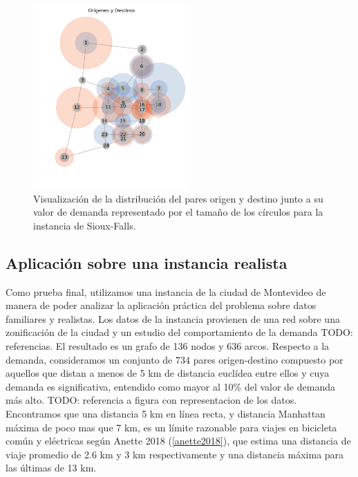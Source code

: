 \documentclass{article}
\begin{document}
  \begin{figure}[h!]
    \centering
    \includegraphics[width=6cm]{../resources/sioux_falls_demand.png}
      \caption{Visualización de la distribución del pares origen y destino junto a su valor de demanda representado por el tamaño de los círculos para la instancia de Sioux-Falls.}
    \label{fig:sioux_falls_demand}
  \end{figure}


  \FloatBarrier
  \subsection{Aplicación sobre una instancia realista}

  Como prueba final, utilizamos una instancia de la ciudad de Montevideo de manera de poder analizar la aplicación práctica del problema sobre datos familiares y realistas. Los datos de la instancia provienen de una red sobre una zonificación de la ciudad y un estudio del comportamiento de la demanda TODO: referencias. El resultado es un grafo de 136 nodos y 636 arcos. Respecto a la demanda, consideramos un conjunto de 734 pares origen-destino compuesto por aquellos que distan a menos de 5 km de distancia euclídea entre ellos y cuya demanda es significativa, entendido como mayor al 10\% del valor de demanda más alto. TODO: referencia a figura con representacion de los datos. Encontramos que una distancia 5 km en línea recta, y distancia Manhattan máxima de poco mas que 7 km, es un límite razonable para viajes en bicicleta común y eléctricas según Anette 2018 (\ref{anette2018}), que estima una distancia de viaje promedio de 2.6 km y 3 km respectivamente y una distancia máxima para las últimas de 13 km.
\end{document}

